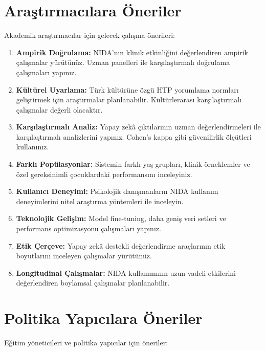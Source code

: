 \section{Araştırmacılara Öneriler}

Akademik araştırmacılar için gelecek çalışma önerileri:

\begin{enumerate}
  \item \textbf{Ampirik Doğrulama:} NIDA'nın klinik etkinliğini değerlendiren ampirik çalışmalar yürütünüz. Uzman panelleri ile karşılaştırmalı doğrulama çalışmaları yapınız.

  \item \textbf{Kültürel Uyarlama:} Türk kültürüne özgü HTP yorumlama normları geliştirmek için araştırmalar planlanabilir. Kültürlerarası karşılaştırmalı çalışmalar değerli olacaktır.

  \item \textbf{Karşılaştırmalı Analiz:} Yapay zekâ çıktılarının uzman değerlendirmeleri ile karşılaştırmalı analizlerini yapınız. Cohen's kappa gibi güvenilirlik ölçütleri kullanınız.

  \item \textbf{Farklı Popülasyonlar:} Sistemin farklı yaş grupları, klinik örneklemler ve özel gereksinimli çocuklardaki performansını inceleyiniz.

  \item \textbf{Kullanıcı Deneyimi:} Psikolojik danışmanların NIDA kullanım deneyimlerini nitel araştırma yöntemleri ile inceleyin.

  \item \textbf{Teknolojik Gelişim:} Model fine-tuning, daha geniş veri setleri ve performans optimizasyonu çalışmaları yapınız.

  \item \textbf{Etik Çerçeve:} Yapay zekâ destekli değerlendirme araçlarının etik boyutlarını inceleyen çalışmalar yürütünüz.

  \item \textbf{Longitudinal Çalışmalar:} NIDA kullanımının uzun vadeli etkilerini değerlendiren boylamsal çalışmalar planlanabilir.
\end{enumerate}

\section{Politika Yapıcılara Öneriler}

Eğitim yöneticileri ve politika yapıcılar için öneriler:

